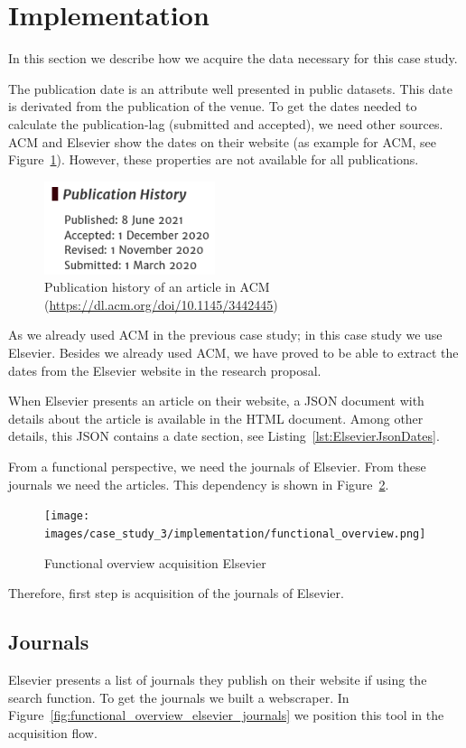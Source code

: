 \documentclass{ou-report}
\begin{document}
\section{Implementation}
In this section we describe how we acquire the data necessary for this case
study.

The publication date is an attribute well presented in public datasets. This 
date is derivated from the publication of the venue. 
To get the dates needed to calculate the publication-lag (submitted and
accepted), we need other sources. ACM and Elsevier show the dates on their
website (as example for ACM, see Figure~\ref{fig:acm_dates}). However, these
properties are not available for all publications.

\begin{figure}[H]
\centering
\includegraphics[width=5cm]{ACM_Digital_Threats_Research_and_Practice.png}
\caption{Publication history of an article in ACM (\url{https://dl.acm.org/doi/10.1145/3442445})}
\label{fig:acm_dates}
\end{figure}

As we already used ACM in the previous case study; in this case study we
use Elsevier. Besides we already used ACM, we have proved to be able to extract
the dates from the Elsevier website in the research proposal.

When Elsevier presents an article on their website, a JSON 
document with details about the article is available in the HTML document. Among
other details, this JSON contains a date section, see 
Listing~\ref{lst:ElsevierJsonDates}.

From a functional perspective, we need the journals of Elsevier. From these journals
we need the articles. This dependency is shown in
Figure~\ref{fig:functional_overview_elsevier}.

\begin{figure}[H]
\centering
\texttt{[image: images/case\_study\_3/implementation/functional\_overview.png]}
\caption{Functional overview acquisition Elsevier}
\label{fig:functional_overview_elsevier}
\end{figure}

Therefore, first step is acquisition of the journals of Elsevier.
\subsection{Journals}
Elsevier presents a list of journals they publish on their website if 
using the search function. To get the journals we built a webscraper.
In Figure~\ref{fig:functional_overview_elsevier_journals} we position
this tool in the acquisition flow.
\end{document}
